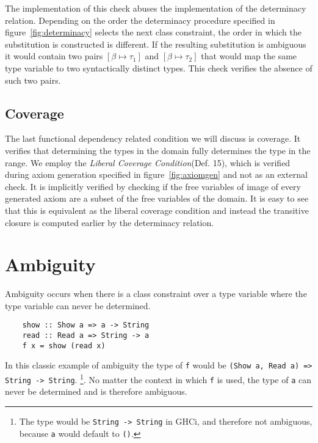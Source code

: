 The implementation of this check abuses the implementation of the determinacy
relation. Depending on the order the determinacy procedure specified in
figure~\ref{fig:determinacy} selects the next class constraint, the order in
which the substitution is constructed is different. If the resulting
substitution is ambiguous it would contain two pairs $[\beta \mapsto \tau_1]$
and $[\beta \mapsto \tau_2]$ that would map the same type variable to two
syntactically distinct types. This check verifies the absence of such two pairs.


\subsection{Coverage}

The last functional dependency related condition we will discuss is coverage.
It verifies that determining the types in the domain fully determines the type
in the range. We employ the \textit{Liberal Coverage Condition}(Def.
15\cite{fundeps-chrs}), which is verified during axiom generation specified in
figure~\ref{fig:axiomgen} and not as an external check. It is implicitly
verified by checking if the free variables of image of every generated axiom are
a subset of the free variables of the domain. It is easy to see that this is
equivalent as the liberal coverage condition and instead the transitive closure
is computed earlier by the determinacy relation.



\section{Ambiguity}

Ambiguity occurs when there is a class constraint over a type variable where the
type variable can never be determined.

\begin{verbatim}
    show :: Show a => a -> String
    read :: Read a => String -> a
    f x = show (read x)
\end{verbatim}

In this classic example of ambiguity the type of \texttt{f} would be
\texttt{(Show a, Read a) => String -> String}. \footnote{The type would be
\texttt{String -> String} in GHCi, and therefore not ambiguous, because
\texttt{a} would default to \texttt{()}.}. No matter the context in which
\texttt{f} is used, the type of \texttt{a} can never be determined and is
therefore ambiguous.

